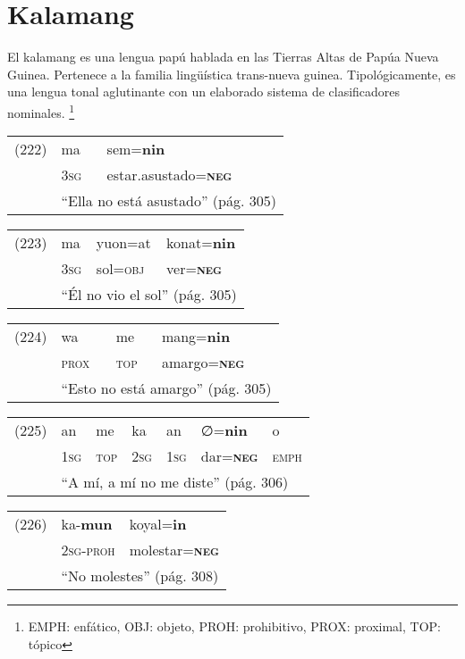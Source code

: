\section*{Kalamang}

\noindent El kalamang es una lengua papú hablada en las Tierras Altas de Papúa Nueva Guinea. Pertenece a la familia lingüística trans-nueva guinea. Tipológicamente, es una lengua tonal aglutinante con un elaborado sistema de clasificadores nominales.
\footnote{EMPH: enfático, OBJ: objeto, PROH: prohibitivo, PROX: proximal, TOP: tópico}
\vspace{0.5cm}

{\setmainfont{Charis SIL} 

\begin{tabular}{lll}
(222) & ma & sem=\textbf{nin} \\
& \textsc{3sg} & estar.asustado=\textsc{\textbf{neg}} \\
& \multicolumn{2}{l}{``Ella no está asustado'' (pág. 305)}
\end{tabular} \vspace{0.5cm}

\begin{tabular}{llll}
(223) & ma & yuon=at & konat=\textbf{nin} \\
& \textsc{3sg} & sol=\textsc{obj} & ver=\textsc{\textbf{neg}} \\
& \multicolumn{3}{l}{``Él no vio el sol'' (pág. 305)}
\end{tabular} \vspace{0.5cm}

\begin{tabular}{llll}
(224) & wa & me & mang=\textbf{nin} \\
& \textsc{prox} & \textsc{top} & amargo=\textsc{\textbf{neg}} \\
& \multicolumn{3}{l}{``Esto no está amargo'' (pág. 305)}
\end{tabular} \vspace{0.5cm}

\begin{tabular}{lllllll}
(225) & an & me & ka & an & ∅=\textbf{nin} & o \\
& \textsc{1sg} & \textsc{top} & \textsc{2sg} & \textsc{1sg} & dar=\textsc{\textbf{neg}} & \textsc{emph} \\
& \multicolumn{6}{l}{``A mí, a mí no me diste'' (pág. 306)}
\end{tabular} \vspace{0.5cm}

\begin{tabular}{lll}
(226) & ka-\textbf{mun} & koyal=\textbf{in} \\
& \textsc{2sg-proh} & molestar=\textsc{\textbf{neg}} \\
& \multicolumn{2}{l}{``No molestes'' (pág. 308)}
\end{tabular} \vspace{0.5cm}

}

